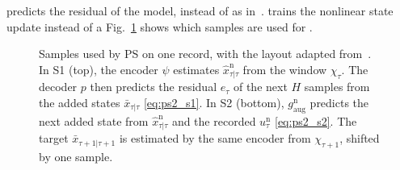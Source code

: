  predicts the residual of the model, instead
of  as in~\cite{hefny2015supervised}.
 trains the nonlinear state update
instead of a 
Fig.~\ref{fig:ps2_windows} shows which samples
are used for .

\begin{figure}[t]
 \centering
 \resizebox{\columnwidth}{!}{}
 \caption{Samples used by PS on one record, with the layout
 adapted from~\cite[Fig.~2]{hefny2015supervised}. In S1 (top), the encoder $\psi$ estimates
 $\hat x^{\mathrm n}_{\tau|\tau}$ from the window $\chi_\tau$. The decoder $p$ then
 predicts the residual $e_\tau$ of the next $H$ samples from the added states
 $\bar x_{\tau|\tau}$ \eqref{eq:ps2_s1}. In S2 (bottom), $g^{\mathrm n}_{\mathrm{aug}}$ predicts
 the next added state from $\hat x^{\mathrm n}_{\tau|\tau}$ and the recorded
 $u^{\mathrm n}_\tau$ \eqref{eq:ps2_s2}. The target $\bar x_{\tau+1|\tau+1}$ is estimated
 by the same encoder from $\chi_{\tau+1}$, shifted by one sample.}
 \label{fig:ps2_windows}
\end{figure}

